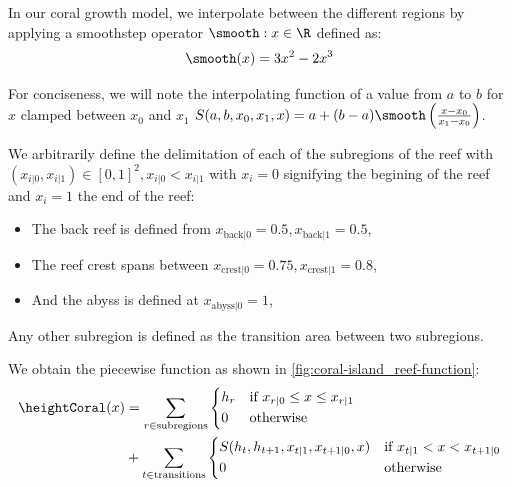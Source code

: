 In our coral growth model, we interpolate between the different regions by applying a smoothstep operator $\smooth: x \in \R$ defined as:
\begin{align}
    \smooth(x) = 3x^2 - 2x^3
\end{align}

For conciseness, we will note the interpolating function of a value from $a$ to $b$ for $x$ clamped between $x_0$ and $x_1$ $S(a, b, x_0, x_1, x) = a + (b-a) \smooth\left(\frac{x - x_0}{x_1 - x_0}\right)$.

We arbitrarily define the delimitation of each of the subregions of the reef with $(x_{i|0}, x_{i|1}) \in [0, 1]^2, x_{i|0} < x_{i|1}$ with $x_i = 0$ signifying the begining of the reef and $x_i = 1$ the end of the reef:
\begin{itemize}
    \item The back reef is defined from $x_{\text{back}|0} = 0.5, x_{\text{back}|1} = 0.5$,
    \item The reef crest spans between $x_{\text{crest}|0} = 0.75, x_{\text{crest}|1} = 0.8$,
    \item And the abyss is defined at $x_{\text{abyss}|0} = 1$,
\end{itemize}
Any other subregion is defined as the transition area between two subregions.

We obtain the piecewise function as shown in \cref{fig:coral-island_reef-function}:
\begin{align}
    \heightCoral(x) &= \sum_{r \in \text{subregions}}{
    \begin{dcases}
        h_r & \text{if } x_{r|0} \leq x \leq x_{r|1} \\
        0 & \text{otherwise}
    \end{dcases}
    } \nonumber \\ 
    &+
    \sum_{t \in \text{transitions}} {
        \begin{dcases}
            S(h_{t}, h_{t+1}, x_{t|1}, x_{t+1|0}, x) & \text{if } x_{t|1} < x < x_{t+1|0} \\
            0 & \text{otherwise}
        \end{dcases}
    }
\end{align}



